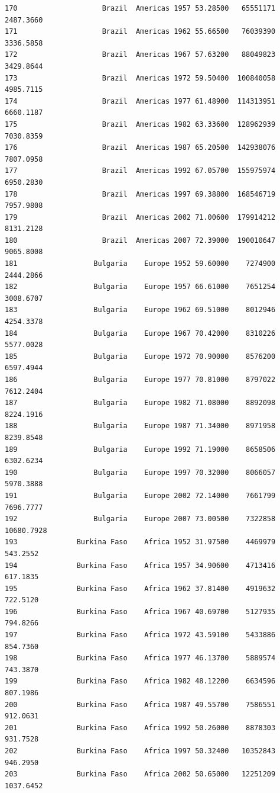 \documentclass[
  letterpaper,
  DIV=11,
  numbers=noendperiod]{scrreprt}
\begin{document}
\begin{verbatim}
170                    Brazil  Americas 1957 53.28500   65551171   2487.3660
171                    Brazil  Americas 1962 55.66500   76039390   3336.5858
172                    Brazil  Americas 1967 57.63200   88049823   3429.8644
173                    Brazil  Americas 1972 59.50400  100840058   4985.7115
174                    Brazil  Americas 1977 61.48900  114313951   6660.1187
175                    Brazil  Americas 1982 63.33600  128962939   7030.8359
176                    Brazil  Americas 1987 65.20500  142938076   7807.0958
177                    Brazil  Americas 1992 67.05700  155975974   6950.2830
178                    Brazil  Americas 1997 69.38800  168546719   7957.9808
179                    Brazil  Americas 2002 71.00600  179914212   8131.2128
180                    Brazil  Americas 2007 72.39000  190010647   9065.8008
181                  Bulgaria    Europe 1952 59.60000    7274900   2444.2866
182                  Bulgaria    Europe 1957 66.61000    7651254   3008.6707
183                  Bulgaria    Europe 1962 69.51000    8012946   4254.3378
184                  Bulgaria    Europe 1967 70.42000    8310226   5577.0028
185                  Bulgaria    Europe 1972 70.90000    8576200   6597.4944
186                  Bulgaria    Europe 1977 70.81000    8797022   7612.2404
187                  Bulgaria    Europe 1982 71.08000    8892098   8224.1916
188                  Bulgaria    Europe 1987 71.34000    8971958   8239.8548
189                  Bulgaria    Europe 1992 71.19000    8658506   6302.6234
190                  Bulgaria    Europe 1997 70.32000    8066057   5970.3888
191                  Bulgaria    Europe 2002 72.14000    7661799   7696.7777
192                  Bulgaria    Europe 2007 73.00500    7322858  10680.7928
193              Burkina Faso    Africa 1952 31.97500    4469979    543.2552
194              Burkina Faso    Africa 1957 34.90600    4713416    617.1835
195              Burkina Faso    Africa 1962 37.81400    4919632    722.5120
196              Burkina Faso    Africa 1967 40.69700    5127935    794.8266
197              Burkina Faso    Africa 1972 43.59100    5433886    854.7360
198              Burkina Faso    Africa 1977 46.13700    5889574    743.3870
199              Burkina Faso    Africa 1982 48.12200    6634596    807.1986
200              Burkina Faso    Africa 1987 49.55700    7586551    912.0631
201              Burkina Faso    Africa 1992 50.26000    8878303    931.7528
202              Burkina Faso    Africa 1997 50.32400   10352843    946.2950
203              Burkina Faso    Africa 2002 50.65000   12251209   1037.6452

\end{verbatim}
\end{document}
